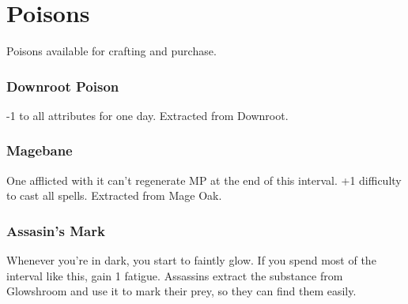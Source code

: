 \section{Poisons}

\begin{multicols}{2}

Poisons available for crafting and purchase.

\subsubsection{Downroot Poison}

-1 to all attributes for one day.
Extracted from Downroot.

\subsubsection{Magebane}

One afflicted with it can't regenerate MP at the end of this \gls{interval}.
+1 difficulty to cast all spells.
Extracted from Mage Oak.

\subsubsection{Assasin's Mark}

Whenever you're in dark, you start to faintly glow.
If you spend most of the \gls{interval} like this, gain 1 \gls{fatigue}.
Assassins extract the substance from Glowshroom and use it to mark their prey, so they can find them easily.

\end{multicols}
